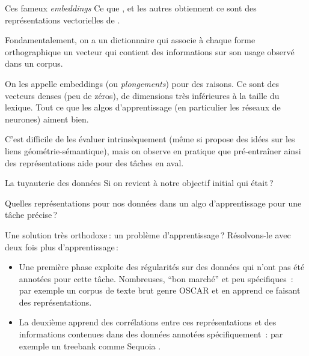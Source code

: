 \documentclass[
	xcolor={svgnames},
	aspectratio=169,
	french,
]{beamer}
\begin{document}
\begin{frame}{Ces fameux \emph{embeddings}}
	Ce que \textcite{bengio2006NeuralProbabilisticLanguage},
	\textcite{mikolov2013EfficientEstimationWord} et les autres obtiennent ce sont des
	\alert{représentations vectorielles} de \alt<+>{mots}{\strikeThrough{mots} formes
	orthographiques}.

	\pause

	Fondamentalement, on a un \alert{dictionnaire} qui associe à chaque forme orthographique un
	vecteur qui contient des  informations sur son usage observé dans un
	corpus.

	\pause

	On les appelle \alert{embeddings} (ou \emph{plongements}) pour des raisons. Ce sont des vecteurs
	denses (peu de zéros), de dimensions très inférieures à la taille du lexique. Tout ce que les
	algos d'apprentissage (en particulier les réseaux de neurones) aiment bien.

	\pause

	C'est difficile de les évaluer intrinsèquement (même si
	\citeauthor{mikolov2013EfficientEstimationWord} propose des idées sur les liens
	géométrie-sémantique), mais on observe en pratique que \alert{pré-entraîner} ainsi des
	représentations aide pour des tâches en aval.
\end{frame}

\begin{frame}{La tuyauterie des données}
	Si on revient à notre objectif initial \pause qui était ?

	\pause

	Quelles représentations pour nos données dans un algo d'apprentissage pour une \alert{tâche}
	précise ?

	\pause

	Une solution très orthodoxe : un problème d'apprentissage ? \pause Résolvons-le avec deux fois
	plus d'apprentissage :
	
	\pause

	\begin{itemize}[<+->]
		\item Une première phase exploite des \alert{régularités} sur des données qui n'ont pas été
		annotées pour cette tâche. Nombreuses, \enquote{bon marché} et peu spécifiques \pause : par
		exemple un corpus de texte brut genre OSCAR
		\parencite{ortizsuarez2019AsynchronousPipelineProcessing} et en apprend ce faisant des
		représentations.
		\item La deuxième apprend des corrélations entre \alert{ces} représentations et des
		informations contenues dans des données \alert{annotées spécifiquement} \pause : par exemple
		un treebank comme Sequoia \parencite{candito2012CorpusSequoiaAnnotation}.
	\end{itemize}
\end{frame}
\end{document}
